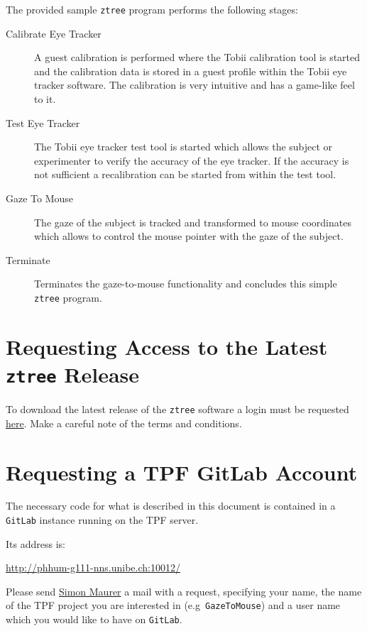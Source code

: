 \documentclass[a4paper,oneside]{book}
\begin{document}
The provided sample \texttt{ztree} program performs the following stages:
\begin{description}
    \item[Calibrate Eye Tracker]
        A guest calibration is performed where the Tobii calibration tool is started and the calibration data is stored in a guest profile within the Tobii eye tracker software.
        The calibration is very intuitive and has a game-like feel to it.
    \item[Test Eye Tracker]
        The Tobii eye tracker test tool is started which allows the subject or experimenter to verify the accuracy of the eye tracker.
        If the accuracy is not sufficient a recalibration can be started from within the test tool.
    \item[Gaze To Mouse]
        The gaze of the subject is tracked and transformed to mouse coordinates which allows to control the mouse pointer with the gaze of the subject.
    \item[Terminate]
        Terminates the gaze-to-mouse functionality and concludes this simple \texttt{ztree} program.
\end{description}

\section{Requesting Access to the Latest \texttt{ztree} Release}
\label{sec.ztree}
To download the latest release of the \texttt{ztree} software a login must be requested \href{https://www.uzh.ch/ztree/ssl-dir/index.php?action=obtain}{here}.
Make a careful note of the terms and conditions.

\section{Requesting a TPF GitLab Account}
\label{sec.gitlab}
The necessary code for what is described in this document is contained in a \texttt{GitLab} instance running on the TPF server.

Its address is:

\url{http://phhum-g111-nns.unibe.ch:10012/}

Please send \href{simon.maurer@humdek.unibe.ch}{Simon Maurer} a mail with a request, specifying your name, the name of the TPF project you are interested in (e.g~\texttt{GazeToMouse}) and a user name which you would like to have on \texttt{GitLab}.
\end{document}
